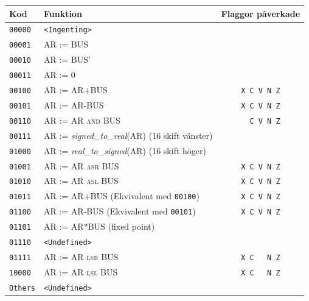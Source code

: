 \documentclass[]{article}
\begin{document}
\begin{tabular}{llc}
	\textbf{Kod}    & \textbf{Funktion}                                      & \textbf{Flaggor påverkade} \\ \hline
	\texttt{00000}  & \texttt{<Ingenting>}                                   &  \\
	\texttt{00001}  & AR := BUS                                              &  \\
	\texttt{00010}  & AR := BUS'                                             &  \\
	\texttt{00011}  & AR := 0                                                &  \\
	\texttt{00100}  & AR := AR+BUS                                           &     \texttt{X C V N Z}     \\
	\texttt{00101}  & AR := AR-BUS                                           &     \texttt{X C V N Z}     \\
	\texttt{00110}  & AR := AR \textsc{and} BUS                              &    \texttt{{ } C V N Z}    \\
	\texttt{00111}  & AR := \textit{signed\_to\_real}(AR) (16 skift vänster) &  \\
	\texttt{01000}  & AR := \textit{real\_to\_signed}(AR) (16 skift höger)   &  \\
	\texttt{01001}  & AR := AR \textsc{asr} BUS                              &     \texttt{X C V N Z}     \\
	\texttt{01010}  & AR := AR \textsc{asl} BUS                              &     \texttt{X C V N Z}     \\
	\texttt{01011}  & AR := AR+BUS (Ekvivalent med \texttt{00100})           &     \texttt{X C V N Z}     \\
	\texttt{01100}  & AR := AR-BUS (Ekvivalent med \texttt{00101})           &     \texttt{X C V N Z}     \\
	\texttt{01101}  & AR := AR*BUS (fixed point)                             &  \\
	\texttt{01110}  & \texttt{<Undefined>}                                   &  \\
	\texttt{01111}  & AR := AR \textsc{lsr} BUS                              &    \texttt{X C { } N Z}    \\
	\texttt{10000}  & AR := AR \textsc{lsl} BUS                              &    \texttt{X C { } N Z}    \\
	\texttt{Others} & \texttt{<Undefined>}                                   &
\end{tabular}
\\
\end{document}
